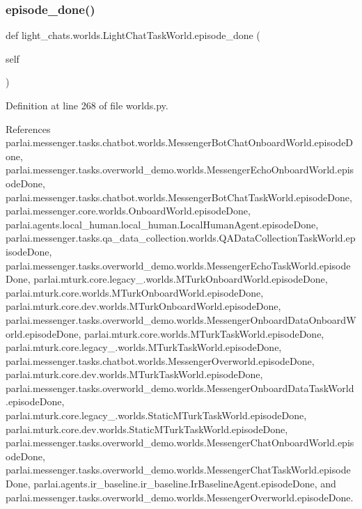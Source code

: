 \subsubsection{\texorpdfstring{episode\+\_\+done()}{episode\_done()}}
{\footnotesize\ttfamily def light\+\_\+chats.\+worlds.\+Light\+Chat\+Task\+World.\+episode\+\_\+done (\begin{DoxyParamCaption}\item[{}]{self }\end{DoxyParamCaption})}



Definition at line 268 of file worlds.\+py.



References parlai.\+messenger.\+tasks.\+chatbot.\+worlds.\+Messenger\+Bot\+Chat\+Onboard\+World.\+episode\+Done, parlai.\+messenger.\+tasks.\+overworld\+\_\+demo.\+worlds.\+Messenger\+Echo\+Onboard\+World.\+episode\+Done, parlai.\+messenger.\+tasks.\+chatbot.\+worlds.\+Messenger\+Bot\+Chat\+Task\+World.\+episode\+Done, parlai.\+messenger.\+core.\+worlds.\+Onboard\+World.\+episode\+Done, parlai.\+agents.\+local\+\_\+human.\+local\+\_\+human.\+Local\+Human\+Agent.\+episode\+Done, parlai.\+messenger.\+tasks.\+qa\+\_\+data\+\_\+collection.\+worlds.\+Q\+A\+Data\+Collection\+Task\+World.\+episode\+Done, parlai.\+messenger.\+tasks.\+overworld\+\_\+demo.\+worlds.\+Messenger\+Echo\+Task\+World.\+episode\+Done, parlai.\+mturk.\+core.\+legacy\+\_.\+worlds.\+M\+Turk\+Onboard\+World.\+episode\+Done, parlai.\+mturk.\+core.\+worlds.\+M\+Turk\+Onboard\+World.\+episode\+Done, parlai.\+mturk.\+core.\+dev.\+worlds.\+M\+Turk\+Onboard\+World.\+episode\+Done, parlai.\+messenger.\+tasks.\+overworld\+\_\+demo.\+worlds.\+Messenger\+Onboard\+Data\+Onboard\+World.\+episode\+Done, parlai.\+mturk.\+core.\+worlds.\+M\+Turk\+Task\+World.\+episode\+Done, parlai.\+mturk.\+core.\+legacy\+\_.\+worlds.\+M\+Turk\+Task\+World.\+episode\+Done, parlai.\+messenger.\+tasks.\+chatbot.\+worlds.\+Messenger\+Overworld.\+episode\+Done, parlai.\+mturk.\+core.\+dev.\+worlds.\+M\+Turk\+Task\+World.\+episode\+Done, parlai.\+messenger.\+tasks.\+overworld\+\_\+demo.\+worlds.\+Messenger\+Onboard\+Data\+Task\+World.\+episode\+Done, parlai.\+mturk.\+core.\+legacy\+\_.\+worlds.\+Static\+M\+Turk\+Task\+World.\+episode\+Done, parlai.\+mturk.\+core.\+dev.\+worlds.\+Static\+M\+Turk\+Task\+World.\+episode\+Done, parlai.\+messenger.\+tasks.\+overworld\+\_\+demo.\+worlds.\+Messenger\+Chat\+Onboard\+World.\+episode\+Done, parlai.\+messenger.\+tasks.\+overworld\+\_\+demo.\+worlds.\+Messenger\+Chat\+Task\+World.\+episode\+Done, parlai.\+agents.\+ir\+\_\+baseline.\+ir\+\_\+baseline.\+Ir\+Baseline\+Agent.\+episode\+Done, and parlai.\+messenger.\+tasks.\+overworld\+\_\+demo.\+worlds.\+Messenger\+Overworld.\+episode\+Done.

